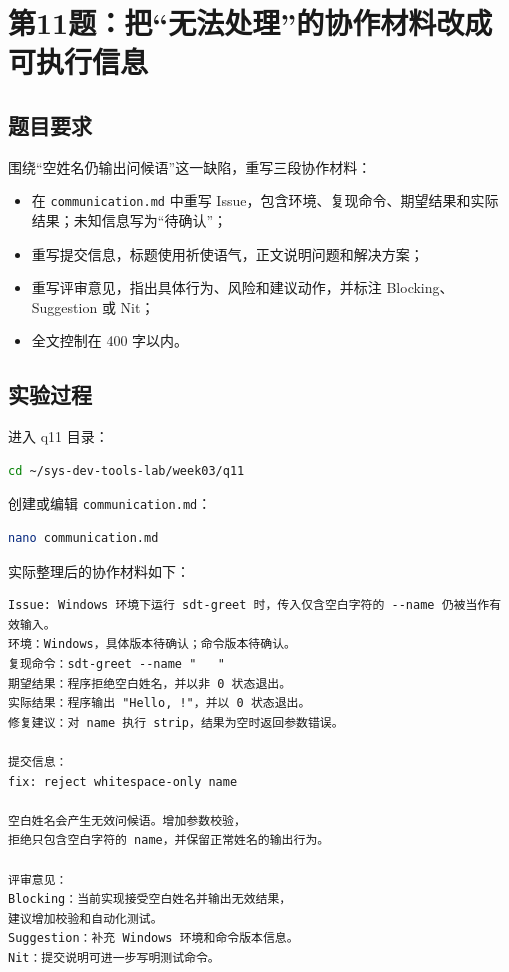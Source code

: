 \documentclass[UTF8,a4paper,12pt]{ctexart}
\begin{document}
\section{第11题：把“无法处理”的协作材料改成可执行信息}

\subsection*{题目要求}

围绕“空姓名仍输出问候语”这一缺陷，重写三段协作材料：

\begin{itemize}
    \item 在 \verb|communication.md| 中重写 Issue，包含环境、复现命令、期望结果和实际结果；未知信息写为“待确认”；
    \item 重写提交信息，标题使用祈使语气，正文说明问题和解决方案；
    \item 重写评审意见，指出具体行为、风险和建议动作，并标注 Blocking、Suggestion 或 Nit；
    \item 全文控制在 400 字以内。
\end{itemize}

\subsection*{实验过程}

进入 q11 目录：

\begin{lstlisting}[language=bash]
cd ~/sys-dev-tools-lab/week03/q11
\end{lstlisting}

创建或编辑 \verb|communication.md|：

\begin{lstlisting}[language=bash]
nano communication.md
\end{lstlisting}

实际整理后的协作材料如下：

\begin{lstlisting}
Issue: Windows 环境下运行 sdt-greet 时，传入仅含空白字符的 --name 仍被当作有效输入。
环境：Windows，具体版本待确认；命令版本待确认。
复现命令：sdt-greet --name "   "
期望结果：程序拒绝空白姓名，并以非 0 状态退出。
实际结果：程序输出 "Hello, !"，并以 0 状态退出。
修复建议：对 name 执行 strip，结果为空时返回参数错误。

提交信息：
fix: reject whitespace-only name

空白姓名会产生无效问候语。增加参数校验，
拒绝只包含空白字符的 name，并保留正常姓名的输出行为。

评审意见：
Blocking：当前实现接受空白姓名并输出无效结果，
建议增加校验和自动化测试。
Suggestion：补充 Windows 环境和命令版本信息。
Nit：提交说明可进一步写明测试命令。
\end{lstlisting}
\end{document}
